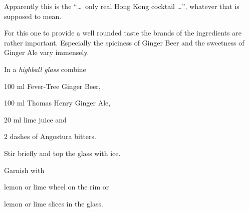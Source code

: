 \startsection[title={Gunner},reference=gunner]
Apparently this is the “\ldots\ only real Hong Kong cocktail \ldots”,
whatever that is supposed to mean.

For this one to provide a well rounded taste the brands of the ingredients
are rather important. Especially the spiciness of Ginger Beer and the
sweetness of Ginger Ale vary immensely.

\startitemize
\item In a {\em highball glass} combine
      \startitemize
      \item 100 ml Fever-Tree Ginger Beer,
      \item 100 ml Thomas Henry Ginger Ale,
      \item 20 ml lime juice and
      \item 2 dashes of Angostura bitters.
      \stopitemize
\item Stir briefly and top the glass with ice.
\item Garnish with
      \startitemize
      \item lemon or lime wheel on the rim or
      \item lemon or lime slices in the glass.
      \stopitemize
\stopitemize

